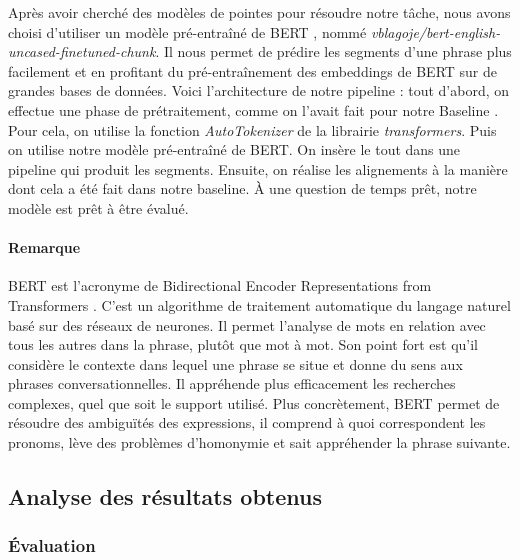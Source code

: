 \documentclass[a4paper, twoside, 11pt]{article}
\begin{document}
 Après avoir cherché des modèles de pointes pour résoudre notre tâche, nous avons choisi d’utiliser un modèle pré-entraîné de \og BERT \fg{}, nommé \textit{vblagoje/bert-english-uncased-finetuned-chunk}. Il nous permet de prédire les segments d’une phrase plus facilement et en profitant du pré-entraînement des embeddings de BERT sur de grandes bases de données. Voici l’architecture de notre pipeline : tout d’abord, on effectue une phase de prétraitement, comme on l'avait fait pour notre \og Baseline \fg{}. Pour cela, on utilise la fonction \textit{AutoTokenizer} de la librairie \textit{transformers}. Puis on utilise notre modèle pré-entraîné de BERT. On insère le tout dans une pipeline qui produit les segments. Ensuite, on réalise les alignements à la manière dont cela a été fait dans notre baseline. À une question de temps prêt, notre modèle est prêt à être évalué.
\paragraph{Remarque}
 BERT est l’acronyme de \og Bidirectional Encoder Representations from Transformers \fg{}. C’est un algorithme de traitement automatique du langage naturel basé sur des réseaux de neurones. Il permet l’analyse de mots en relation avec tous les autres dans la phrase, plutôt que mot à mot. Son point fort est qu’il considère le contexte dans lequel une phrase se situe et donne du sens aux phrases conversationnelles. Il appréhende plus efficacement les recherches complexes, quel que soit le support utilisé. Plus concrètement, BERT permet de résoudre des ambiguïtés des expressions, il comprend à quoi correspondent les pronoms, lève des problèmes d’homonymie et sait appréhender la phrase suivante.

 \subsection{Analyse des résultats obtenus}
 \subsubsection{Évaluation}
\end{document}
